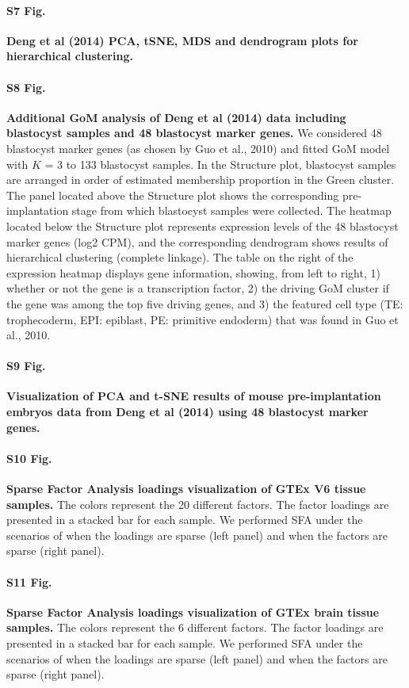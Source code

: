 \documentclass[10pt,letterpaper]{article}
\begin{document}
\paragraph*{S7 Fig.}
\label{figS7}
\textbf{ Deng et al (2014) PCA, tSNE, MDS and dendrogram plots for hierarchical clustering.}

\paragraph*{S8 Fig.}
\label{figS8}
\textbf{ Additional GoM analysis of Deng et al (2014) data including blastocyst samples and 48 blastocyst marker genes.} We considered 48 blastocyst marker genes (as chosen by Guo et al., 2010) and fitted GoM model with $K$ = 3 to 133 blastocyst samples. In the Structure plot, blastocyst samples are arranged in order of estimated membership proportion in the Green cluster. The panel
located above the Structure plot shows the corresponding pre-implantation stage from which blastocyst samples were collected. The heatmap located below the Structure plot represents expression levels of the 48 blastocyst marker genes (log2 CPM), and the corresponding dendrogram shows results of hierarchical
clustering (complete linkage). The table on the right of the expression heatmap displays gene information, showing, from left to right, 1) whether or not the gene is a transcription factor, 2) the driving GoM cluster if the gene was among the top five driving genes, and 3) the featured cell type (TE: trophecoderm, EPI: epiblast, PE: primitive endoderm) that was found in Guo et al., 2010.

\paragraph*{S9 Fig.}
\label{figS9}
\textbf{Visualization of PCA and t-SNE results of mouse pre-implantation embryos data from Deng et al (2014) using 48 blastocyst marker genes.}

\paragraph*{S10 Fig.}
\label{figS10}
\textbf{Sparse Factor Analysis loadings visualization of GTEx V6 tissue samples.} The colors represent the 20 different factors. The factor loadings are presented in a stacked bar for each sample. We performed SFA under the scenarios of when the loadings are sparse (left panel) and when the factors are sparse (right panel).

\paragraph*{S11 Fig.}
\label{figS11}
\textbf{Sparse Factor Analysis loadings visualization of GTEx brain tissue samples.} The colors represent the 6 different factors. The factor loadings are presented in a stacked bar for each sample. We performed SFA under the scenarios of when the loadings are sparse (left panel) and when the factors are
sparse (right panel).
\end{document}
